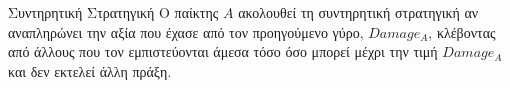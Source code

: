 {}
\begin{definitiongr}{Συντηρητική Στρατηγική}
  Ο παίκτης $A$ ακολουθεί τη συντηρητική στρατηγική αν αναπληρώνει την αξία που έχασε από τον προηγούμενο γύρο, $Damage_A$,
  κλέβοντας από άλλους που τον εμπιστεύονται άμεσα τόσο όσο μπορεί μέχρι την τιμή $Damage_A$ και δεν εκτελεί άλλη πράξη.
\end{definitiongr}
